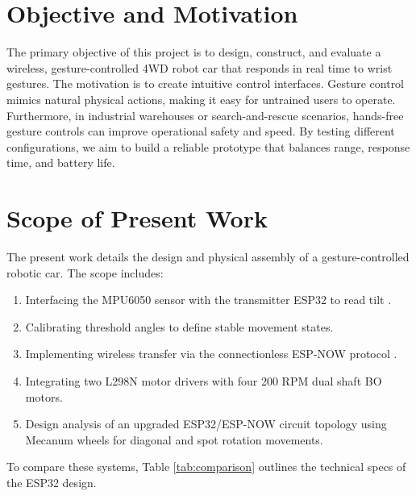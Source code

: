 \documentclass[12pt,a4paper,oneside]{report}
\begin{document}
\section{Objective and Motivation}
The primary objective of this project is to design, construct, and evaluate a wireless, gesture-controlled 4WD robot car that responds in real time to wrist gestures. The motivation is to create intuitive control interfaces. Gesture control mimics natural physical actions, making it easy for untrained users to operate. Furthermore, in industrial warehouses or search-and-rescue scenarios, hands-free gesture controls can improve operational safety and speed. By testing different configurations, we aim to build a reliable prototype that balances range, response time, and battery life.

\section{Scope of Present Work}
The present work details the design and physical assembly of a gesture-controlled robotic car. The scope includes:
\begin{enumerate}[noitemsep,topsep=2pt,parsep=0pt,partopsep=0pt]
    \item Interfacing the MPU6050 sensor with the transmitter ESP32 to read tilt \cite{imu_main}.
    \item Calibrating threshold angles to define stable movement states.
    \item Implementing wireless transfer via the connectionless ESP-NOW protocol \cite{espnow_ref}.
    \item Integrating two L298N motor drivers with four 200 RPM dual shaft BO motors.
    \item Design analysis of an upgraded ESP32/ESP-NOW circuit topology using Mecanum wheels for diagonal and spot rotation movements.
\end{enumerate}
To compare these systems, Table \ref{tab:comparison} outlines the technical specs of the ESP32 design.\par
\vspace{0.05in}
\end{document}
